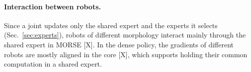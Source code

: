 \paragraph{Interaction between robots.}
Since a joint updates only the shared expert and the experts it selects (Sec.~\ref{sec:experts}), robots of different
morphology interact mainly through the shared expert in MORSE [X]. In the dense policy, the gradients of different
robots are mostly aligned in the core [X], which supports holding their common computation in a shared expert.
